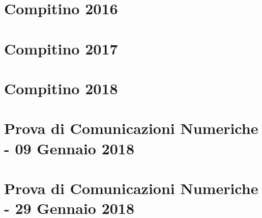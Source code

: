 \documentclass[12pt,oneside,openany]{memoir}
\numberwithin{equation}{subsection}
\begin{document}
\section{Compitino 2016}


\section{Compitino 2017}


\section{Compitino 2018}


\section{Prova di Comunicazioni Numeriche - 09 Gennaio 2018}


\section{Prova di Comunicazioni Numeriche - 29 Gennaio 2018}

\end{document}
